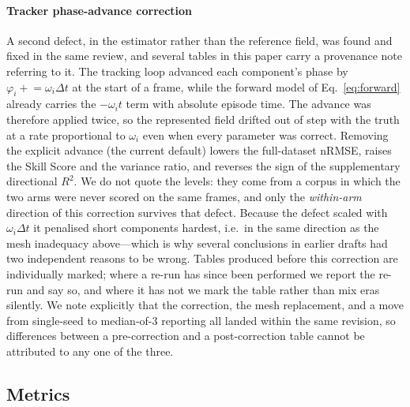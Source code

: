\documentclass[review]{elsarticle}
\begin{document}
\paragraph{Tracker phase-advance correction}
A second defect, in the estimator rather than the reference field, was
found and fixed in the same review, and several tables in this paper carry
a provenance note referring to it.  The tracking loop advanced each
component's phase by $\varphi_i \mathrel{+}= \omega_i \Delta t$ at the
start of a frame, while the forward model of Eq.~\eqref{eq:forward}
already carries the $-\omega_i t$ term with absolute episode time.  The
advance was therefore applied twice, so the represented field drifted out
of step with the truth at a rate proportional to $\omega_i$ even when
every parameter was correct.  Removing the explicit advance
(the current default) lowers the full-dataset nRMSE, raises the Skill Score
and the variance ratio, and reverses the sign of the supplementary directional
$R^2$. We do not quote the levels: they come from a corpus in which the two arms
were never scored on the same frames, and only the \emph{within-arm} direction of
this correction survives that defect.  Because the defect scaled with
$\omega_i \Delta t$ it penalised short components hardest, i.e.\ in the
same direction as the mesh inadequacy above---which is why several
conclusions in earlier drafts had two independent reasons to be wrong.
Tables produced before this correction are individually marked; where a
re-run has since been performed we report the re-run and say so, and
where it has not we mark the table rather than mix eras silently.
We note explicitly that the correction, the mesh replacement, and a move
from single-seed to median-of-3 reporting all landed within the same
revision, so differences between a pre-correction and a post-correction
table cannot be attributed to any one of the three.

\subsection{Metrics}
\label{sec:metrics}
\end{document}
